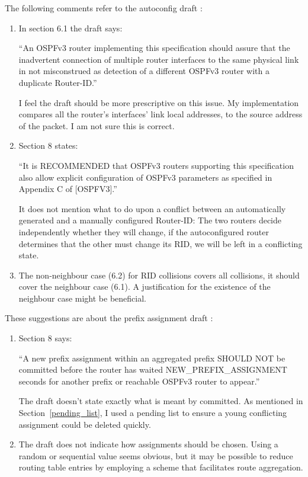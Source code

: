 The following comments refer to the autoconfig draft
\cite{draft-ietf-ospf-ospfv3-autoconfig-02}:
\begin{enumerate}
	\item In section 6.1 the draft says: 

		``An OSPFv3 router implementing this specification should assure that the
		inadvertent connection of multiple router interfaces to the same physical
		link in not misconstrued as detection of a different OSPFv3 router with a
		duplicate Router-ID.'' 

		 I feel the draft should be more prescriptive on this issue.  My
		 implementation compares all the router's interfaces' link local addresses,
		 to the source address of the packet. I am not sure this is correct.
	\item Section 8 states:

		``It is RECOMMENDED that OSPFv3 routers supporting this specification
		also allow explicit configuration of OSPFv3 parameters as specified
		in Appendix C of [OSPFV3].''

		It does not mention what to do upon a conflict between an automatically
		generated and a manually configured Router-ID: The two routers decide
		independently whether they will change, if the autoconfigured router
		determines that the other must change its RID, we will be left in a
		conflicting state.
	\item  The non-neighbour case (6.2) for RID collisions covers all collisions,
		it should cover the neighbour case (6.1). A justification for the existence
		of the neighbour case might be beneficial.
\end{enumerate}

These suggestions are about the prefix assignment draft
\cite{draft-arkko-homenet-prefix-assignment-03}:
\begin{enumerate}
	\item Section 8 says:

		``A new prefix assignment within an aggregated prefix SHOULD NOT be
		committed before the router has waited NEW\_PREFIX\_ASSIGNMENT seconds for
		another prefix or reachable OSPFv3 router to appear.''

		The draft doesn't state exactly what is meant by committed. As mentioned in
		Section~\ref{pending_list}, I used a pending list to ensure a young
		conflicting assignment could be deleted quickly.
	\item The draft does not indicate how assignments should be chosen. Using a
		random or sequential value seems obvious, but it may be possible to reduce
		routing table entries by employing a scheme that facilitates route
		aggregation. 
\end{enumerate}


